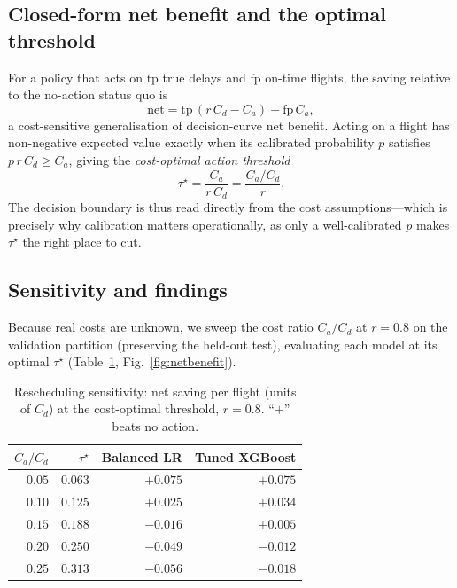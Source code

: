 \documentclass[conference]{IEEEtran}
\begin{document}
\subsection{Closed-form net benefit and the optimal threshold}
For a policy that acts on $\mathrm{tp}$ true delays and $\mathrm{fp}$ on-time
flights, the saving relative to the no-action status quo is
\begin{equation}
\text{net} = \mathrm{tp}\,(r\,C_d - C_a) - \mathrm{fp}\,C_a,
\label{eq:net}
\end{equation}
a cost-sensitive generalisation of decision-curve net benefit. Acting on a flight
has non-negative expected value exactly when its calibrated probability $p$
satisfies $p\,r\,C_d \geq C_a$, giving the \emph{cost-optimal action threshold}
\begin{equation}
\tau^\star = \frac{C_a}{r\,C_d} = \frac{C_a/C_d}{r}.
\label{eq:tau}
\end{equation}
The decision boundary is thus read directly from the cost assumptions---which is
precisely why calibration matters operationally, as only a well-calibrated $p$
makes $\tau^\star$ the right place to cut.

\subsection{Sensitivity and findings}
Because real costs are unknown, we sweep the cost ratio $C_a/C_d$ at $r=0.8$ on
the validation partition (preserving the held-out test), evaluating each model at
its optimal $\tau^\star$ (Table~\ref{tab:sweep}, Fig.~\ref{fig:netbenefit}).

\begin{table}[!t]
  \caption{Rescheduling sensitivity: net saving per flight (units of $C_d$) at
  the cost-optimal threshold, $r=0.8$. ``$+$'' beats no action.}
  \label{tab:sweep}
  \centering
  \begin{tabular}{rrrr}
    \toprule
    $C_a/C_d$ & $\tau^\star$ & Balanced LR & Tuned XGBoost \\
    \midrule
    $0.05$ & $0.063$ & $+0.075$ & $+0.075$ \\
    $0.10$ & $0.125$ & $+0.025$ & $+0.034$ \\
    $0.15$ & $0.188$ & $-0.016$ & $+0.005$ \\
    $0.20$ & $0.250$ & $-0.049$ & $-0.012$ \\
    $0.25$ & $0.313$ & $-0.056$ & $-0.018$ \\
    \bottomrule
  \end{tabular}
\end{table}
\end{document}
